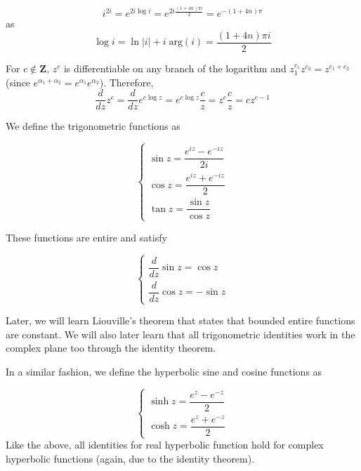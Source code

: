 \vspace{2ex}
\begin{ex}
\[i^{2i}=e^{2i\log i}=e^{2i\frac{(1+4n )\pi i}{2}}=e^{-(1+4n )\pi }\]
as
\[\log i=\ln|i|+i\;\mathrm{arg}(i)=\dfrac{(1+4n)\pi i}{2}\]
\end{ex}
\vspace{2ex}
\begin{rmk}
For $c\notin {\bm Z}$, $z^{c}$ is differentiable on any branch of the logarithm and $z_1^{c_1}z^{c_2}=z^{c_1+c_2}$ (since $e^{\alpha_1+\alpha_2}=e^{\alpha_1}e^{\alpha_2}$). Therefore,
\[\dfrac{d }{d z}z^{c}=\dfrac{d }{d z}e^{c\log z}=e^{c\log z}\dfrac{c}{z}=z^{c}\dfrac{c}{z}=cz^{c-1}  \]
\end{rmk}
\vspace{2ex}
\begin{defi}
We define the trigonometric functions as
\begin{spacing}{2}
\[\begin{cases}
\sin z=\dfrac{e^{iz}-e^{-iz}}{2i}\\
\cos z=\dfrac{e^{iz}+e^{-iz}}{2}\\
\tan z=\dfrac{\sin z}{\cos z}
\end{cases}\]
\end{spacing}
These functions are entire and satisfy
\begin{spacing}{2}
\[\begin{cases}
\dfrac{d }{dz}\sin z=\cos z\\
\dfrac{d }{d z}\cos z=-\sin z 
\end{cases}\]
\end{spacing}
Later, we will learn Liouville's theorem that states that bounded entire functions are constant. We will also later learn that all trigonometric identities work in the complex plane too through the identity theorem.
\end{defi}
\vspace{2ex}
\begin{defi}
In a similar fashion, we define the hyperbolic sine and cosine functions as 
\begin{spacing}{2}
\[\begin{cases}
\sinh z =\dfrac{e^{z}-e^{-z}}{2}\\
\cosh z =\dfrac{e^{z}+e^{-z}}{2}
\end{cases}\]
Like the above, all identities for real hyperbolic function hold for complex hyperbolic functions (again, due to the identity theorem). 
\end{spacing}
\end{defi}

